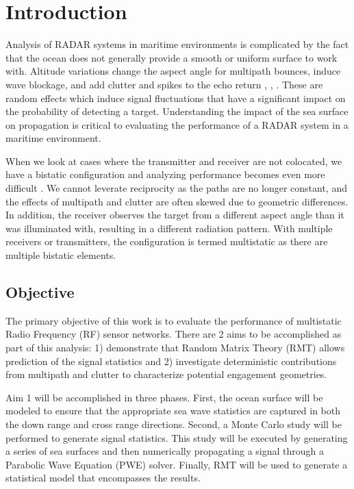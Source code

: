 \chapter{Introduction}
Analysis of RADAR systems in maritime environments is complicated by the fact that the ocean does not generally provide a smooth or uniform surface to work with. Altitude variations change the aspect angle for multipath bounces, induce wave blockage, and add clutter and spikes to the echo return \cite{skolnik_handbook}, \cite{blake_radar}, \cite{nathanson_radar}. These are random effects which induce signal fluctuations that have a significant impact on the probability of detecting a target. Understanding the impact of the sea surface on propagation is critical to evaluating the performance of a RADAR system in a maritime environment.

When we look at cases where the transmitter and receiver are not colocated, we have a bistatic configuration and analyzing performance becomes even more difficult \cite{willis_bistatic}. We cannot leverate reciprocity as the paths are no longer constant, and the effects of multipath and clutter are often skewed due to geometric differences.  In addition, the receiver observes the target from a different aspect angle than it was illuminated with, resulting in a different radiation pattern. With multiple receivers or transmitters, the configuration is termed multistatic as there are multiple bistatic elements.

\section{Objective}
The primary objective of this work is to evaluate the performance of multistatic Radio Frequency (RF) sensor networks. There are 2 aims to be accomplished as part of this analysis: 1) demonstrate that Random Matrix Theory (RMT) allows prediction of the signal statistics and 2) investigate deterministic contributions from multipath and clutter to characterize potential engagement geometries. 

Aim 1 will be accomplished in three phases. First, the ocean surface will be modeled to ensure that the appropriate sea wave statistics are captured in both the down range and cross range directions. Second, a Monte Carlo study will be performed to generate signal statistics. This study will be executed by generating a series of sea surfaces and then numerically propagating a signal through a Parabolic Wave Equation (PWE) solver. Finally, RMT will be used to generate a statistical model that encompasses the results.

